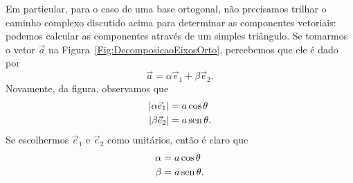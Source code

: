 Em particular, para o caso de uma base ortogonal, não precisamos trilhar o caminho complexo discutido acima para determinar as componentes vetoriais: podemos calcular as componentes através de um simples triângulo. Se tomarmos o vetor $\vec{a}$ na Figura~\ref{Fig:DecomposicaoEixosOrto}, percebemos que ele é dado por
\begin{equation}\label{eq:vec_a}
    \vec{a} = \alpha\vec{e}_1 + \beta\vec{e}_2.
\end{equation}
%
Novamente, da figura, observamos que
\begin{align}
    |\alpha\vec{e}_1| &= a\cos\theta \\
    |\beta\vec{e}_2| &= a\operatorname{sen}\theta.
\end{align}
%
Se escolhermos $\vec{e}_1$ e $\vec{e}_2$ como unitários, então é claro que
\begin{align}
    \alpha &= a\cos\theta \\
    \beta &= a\operatorname{sen}\theta.
\end{align}

